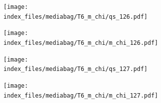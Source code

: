 \documentclass[
  11pt,
  letterpaper,
]{scrreprt}
\begin{document}
\begin{figure}

\begin{minipage}{0.50\linewidth}

\begin{figure}[H]

{\centering \texttt{[image: index\_files/mediabag/T6\_m\_chi/qs\_126.pdf]}

}


\end{figure}%

\end{minipage}%
%
\begin{minipage}{0.50\linewidth}

\begin{figure}[H]

{\centering \texttt{[image: index\_files/mediabag/T6\_m\_chi/m\_chi\_126.pdf]}

}


\end{figure}%

\end{minipage}%

\end{figure}%

\begin{figure}

\begin{minipage}{0.50\linewidth}

\begin{figure}[H]

{\centering \texttt{[image: index\_files/mediabag/T6\_m\_chi/qs\_127.pdf]}

}


\end{figure}%

\end{minipage}%
%
\begin{minipage}{0.50\linewidth}

\begin{figure}[H]

{\centering \texttt{[image: index\_files/mediabag/T6\_m\_chi/m\_chi\_127.pdf]}

}


\end{figure}%

\end{minipage}%

\end{figure}%
\end{document}
